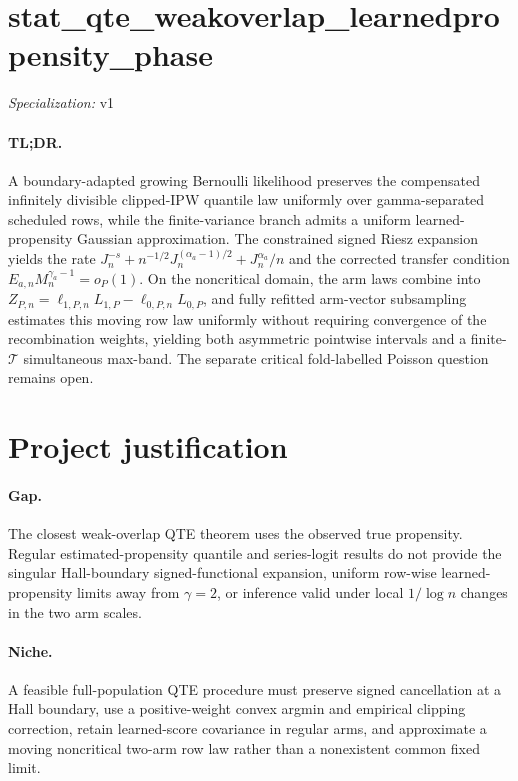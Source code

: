 \documentclass{article}
\begin{document}
\sloppy

\section*{stat\_\allowbreak{}qte\_\allowbreak{}weakoverlap\_\allowbreak{}learnedpropensity\_\allowbreak{}phase}

\noindent\textit{Specialization:} v1\par

\paragraph{TL;DR.} A boundary-adapted growing Bernoulli likelihood preserves the compensated infinitely divisible clipped-IPW quantile law uniformly over gamma-separated scheduled rows, while the finite-variance branch admits a uniform learned-propensity Gaussian approximation. The constrained signed Riesz expansion yields the rate \(J_n^{-s}+n^{-1/2}J_n^{(\alpha_a-1)/2}+J_n^{\alpha_a}/n\) and the corrected transfer condition \(E_{a,n}M_n^{\gamma_a-1}=o_P(1)\). On the noncritical domain, the arm laws combine into \(Z_{P,n}=\ell_{1,P,n}L_{1,P}-\ell_{0,P,n}L_{0,P}\), and fully refitted arm-vector subsampling estimates this moving row law uniformly without requiring convergence of the recombination weights, yielding both asymmetric pointwise intervals and a finite-\(\mathcal T\) simultaneous max-band. The separate critical fold-labelled Poisson question remains open.

\section{Project justification}

\paragraph{Gap.} The closest weak-overlap QTE theorem uses the observed true propensity. Regular estimated-propensity quantile and series-logit results do not provide the singular Hall-boundary signed-functional expansion, uniform row-wise learned-propensity limits away from \(\gamma=2\), or inference valid under local \(1/\log n\) changes in the two arm scales.

\paragraph{Niche.} A feasible full-population QTE procedure must preserve signed cancellation at a Hall boundary, use a positive-weight convex argmin and empirical clipping correction, retain learned-score covariance in regular arms, and approximate a moving noncritical two-arm row law rather than a nonexistent common fixed limit.
\end{document}
